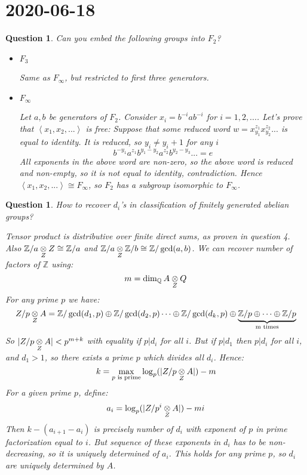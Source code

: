 \documentclass[a4paper]{article}
\newtheorem{que}[thm]{Question}
\begin{document}
\section*{ 2020-06-18}

\begin{que} Can you embed the following groups into $F_2$?
	\begin{itemize}
		\item $F_3$ 
		
		Same as $F_\infty$, but restricted to first three generators.
		\item $F_\infty$ 
		
		Let $a, b$ be generators of $F_2$. Consider $x_i = b^{-i} a b^{-i}$ for $i = 1, 2, ...$.
			Let's prove that $\left< x_1, x_2, ... \right>$ is free:
			Suppose that some reduced word $w = x_{y_1}^{z_1} x_{y_2}^{z_2} ...$ is equal to identity.
			It is reduced, so $y_i \neq y_i+1$ for any $i$	
			$$b^{-y_1} a^{z_1} b^{y_1- y_2} a^{z_2} b^{y_2 - y_3} ... = e$$
			All exponents in the above word are non-zero, so the above word is reduced and non-empty, so it is not equal to identity, contradiction.
			Hence $\left< x_1, x_2, ... \right> \cong F_{\infty}$, so $F_2$ has a subgroup isomorphic to $F_{\infty}$.
			
	\end{itemize}
\end{que} 
\begin{que} How to recover $d_i$'s in classification of finitely generated abelian groups?
	
	Tensor product is distributive over finite direct sums, as proven in question 4.
	Also $\mathbb{Z}/a \mathbin{\mathop{\otimes}\limits_{Z}} Z \cong \mathbb{Z}/a$ and $\mathbb{Z}/a \mathbin{\mathop{\otimes}\limits_{Z}} \mathbb{Z}/b \cong \mathbb{Z}/\gcd(a,b)$. We can recover number of factors of $\mathbb{Z}$ using:
	$$m = \dim_{\mathbb{Q}} A \mathbin{\mathop{\otimes}\limits_{Z}} Q$$
	For any prime $p$ we have:
	$$Z/p \mathbin{\mathop{\otimes}\limits_{Z}} A = \mathbb{Z}/\gcd(d_1, p) \oplus \mathbb{Z}/\gcd(d_2, p) \cdots  \oplus \mathbb{Z}/\gcd(d_k, p) \oplus \underbrace{\mathbb{Z}/p \oplus \cdots \oplus \mathbb{Z}/p}_\text{m times}$$
	So $|Z/p \mathbin{\mathop{\otimes}\limits_{Z}} A| < p^{m+k}$ with equality if $p | d_i$ for all $i$.
	But if $p | d_1$ then $p | d_i$ for all $i$, and $d_1 > 1$, so there exists a prime $p$ which divides all $d_i$. Hence:
	$$k = \max_{p \text{ is prime}} \log_p(|Z/p \mathbin{\mathop{\otimes}\limits_{Z}} A|) - m$$
	For a given prime $p$, define:
	$$a_i = \log_p(|Z/p^i \mathbin{\mathop{\otimes}\limits_{Z}} A|) - m i$$
	Then $k -(a_{i+1} - a_{i})$ is precisely number of $d_i$ with exponent of $p$ in prime factorization equal to $i$. But sequence of these exponents in $d_i$ has to be non-decreasing, so it is uniquely determined of $a_i$. This holds for any prime $p$, so $d_i$ are uniquely determined by $A$.
\end{que}
\end{document}
